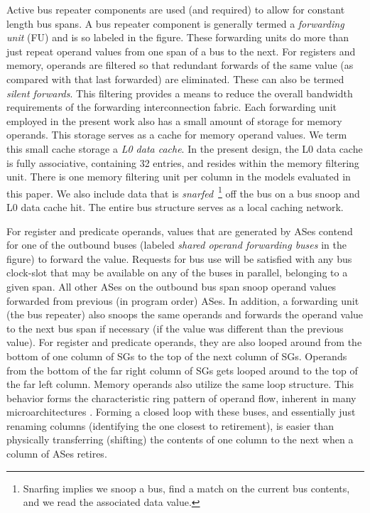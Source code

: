 \documentclass[10pt,twocolumn,dvips]{article}
\begin{document}
Active bus repeater components are used (and required) to 
allow for constant length bus spans.
A bus repeater component is generally termed a
{\em forwarding unit} (FU) and is so labeled in the figure.
These forwarding units do more than just repeat operand values from
one span of a bus to the next.
For registers and memory, operands are filtered so that
redundant forwards of the same value (as compared with that last forwarded)
are eliminated.  These can also be termed {\em silent forwards}.
This filtering provides a means to reduce the overall bandwidth
requirements of the forwarding interconnection fabric.
Each forwarding unit employed in the present work also has a small
amount of storage for memory operands.
This storage serves as a cache for memory operand values.
We term this small cache storage a {\em L0 data cache}.
In the present design, the L0 data cache is fully associative,
containing 32 entries, and resides within the memory filtering
unit.  There is one memory filtering unit per column in the
models evaluated in this paper.  We also include data that is
{\em snarfed}~\footnote{Snarfing implies we snoop a bus, find a
match on the current bus contents, and we read the associated
data value.}
off the bus on a bus snoop and L0 data cache hit.
The entire bus structure serves as a local caching network.

For register and predicate operands, values that are generated
by ASes contend for one of the outbound buses
(labeled {\em shared operand forwarding buses} in the figure) 
to forward the value.
Requests for bus use will be satisfied with any bus clock-slot that may be
available on any of the buses in parallel, belonging to
a given span.  All other ASes on the outbound bus span snoop
operand values forwarded from previous (in program order)
ASes.  In addition, a forwarding unit (the bus repeater) also
snoops the same operands and forwards the operand value to the
next bus span if necessary (if the value was different than the previous
value).  For register and predicate operands, they are also
looped around from the bottom of one column of SGs
to the top of the next column of SGs.  
Operands from the bottom of the
far right column of SGs gets looped around to the
top of the far left column. Memory operands also utilize the
same loop structure. 
This behavior forms the characteristic ring pattern of operand flow,
inherent in many microarchitectures \cite{Ranganathan98}.
Forming a closed loop
with these buses, and essentially just renaming columns (identifying the
one closest to retirement), is easier than physically transferring
(shifting) the contents of one column to the next when a column
of ASes retires.
\end{document}

